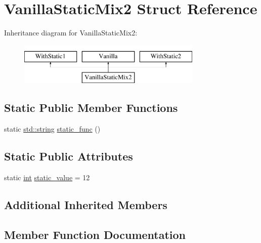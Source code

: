 \hypertarget{struct_vanilla_static_mix2}{}\section{Vanilla\+Static\+Mix2 Struct Reference}
\label{struct_vanilla_static_mix2}
Inheritance diagram for Vanilla\+Static\+Mix2\+:\begin{figure}[H]
\begin{center}
\leavevmode
\includegraphics[height=2.000000cm]{struct_vanilla_static_mix2}
\end{center}
\end{figure}
\subsection*{Static Public Member Functions}
\begin{DoxyCompactItemize}
\item 
static \mbox{\hyperlink{_s_d_l__opengl__glext_8h_ab4ccfaa8ab0e1afaae94dc96ef52dde1}{std\+::string}} \mbox{\hyperlink{struct_vanilla_static_mix2_a9f5b57ee09fa0a749f548f939491e49d}{static\+\_\+func}} ()
\end{DoxyCompactItemize}
\subsection*{Static Public Attributes}
\begin{DoxyCompactItemize}
\item 
static \mbox{\hyperlink{warnings_8h_a74f207b5aa4ba51c3a2ad59b219a423b}{int}} \mbox{\hyperlink{struct_vanilla_static_mix2_aaf857eef76c09ce635283774c2f6b77b}{static\+\_\+value}} = 12
\end{DoxyCompactItemize}
\subsection*{Additional Inherited Members}


\subsection{Member Function Documentation}
\mbox{\label{struct_vanilla_static_mix2_a9f5b57ee09fa0a749f548f939491e49d}} 

